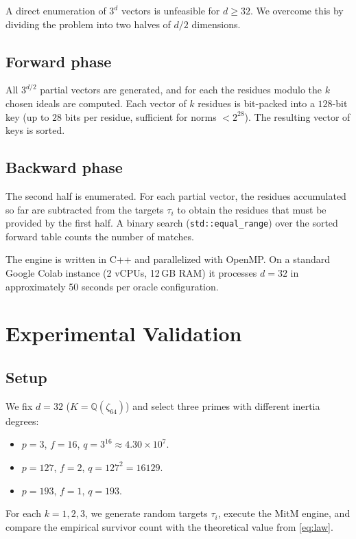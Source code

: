 \documentclass[12pt,a4paper]{article}
\begin{document}
A direct enumeration of $3^d$ vectors is unfeasible for $d \ge 32$. We overcome this by dividing the problem into two halves of $d/2$ dimensions.

\subsection{Forward phase}
All $3^{d/2}$ partial vectors are generated, and for each the residues modulo the $k$ chosen ideals are computed. Each vector of $k$ residues is bit-packed into a $128$-bit key (up to $28$ bits per residue, sufficient for norms $< 2^{28}$). The resulting vector of keys is sorted.

\subsection{Backward phase}
The second half is enumerated. For each partial vector, the residues accumulated so far are subtracted from the targets $\tau_i$ to obtain the residues that must be provided by the first half. A binary search (\texttt{std::equal\_range}) over the sorted forward table counts the number of matches.

The engine is written in C++ and parallelized with OpenMP. On a standard Google Colab instance (2 vCPUs, 12 GB RAM) it processes $d=32$ in approximately 50 seconds per oracle configuration.

\section{Experimental Validation}
\label{sec:experiments}

\subsection{Setup}
We fix $d=32$ ($K = \mathbb{Q}(\zeta_{64})$) and select three primes with different inertia degrees:
\begin{itemize}
    \item $p=3$, $f=16$, $q = 3^{16} \approx 4.30 \times 10^{7}$.
    \item $p=127$, $f=2$, $q = 127^{2} = 16129$.
    \item $p=193$, $f=1$, $q = 193$.
\end{itemize}
For each $k=1,2,3$, we generate random targets $\tau_i$, execute the MitM engine, and compare the empirical survivor count with the theoretical value from \eqref{eq:law}.
\end{document}

